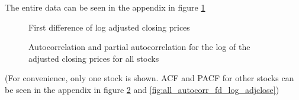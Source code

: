 The entire data can be seen in the appendix in figure \ref{fig:all_fd_log_adjclose}

\begin{figure}[h]
    \centering
    \begin{adjustbox}{width=.9\textwidth,center}
    
    \end{adjustbox}  
    \caption{First difference of log adjusted closing prices}
    \label{fig:all_fd_log_adjclose}
\end{figure}{}



\begin{figure}[h]
    \centering
    \begin{adjustbox}{width=.85\textwidth,center}
    
    \end{adjustbox}  
    \caption{Autocorrelation and partial autocorrelation for the log of the adjusted closing prices for all stocks}
    \label{fig:acf_pacf_log_adjclose}
\end{figure}{}

 (For convenience, only one stock is shown. ACF and PACF for other stocks can be seen in the appendix in figure \ref{fig:acf_pacf_log_adjclose} and  \ref{fig:all_autocorr_fd_log_adjclose})
 
 
 
 



\begin{table}[h]
    \centering
    
    \caption{}
    \label{tab:V_AR1_log_returns}
\end{table}

\begin{table}[h]
    \centering
    
    \caption{}
    \label{tab:V_MA1_log_returns}
\end{table}{}

\begin{table}[h]
    \centering
    
    \caption{}
    \label{tab:V_ARMA11_log_returns2}
\end{table}{}

\begin{table}[h]
    \centering
    
    \caption{}
    \label{tab:V_ARMA21_log_returns}
\end{table}{}




